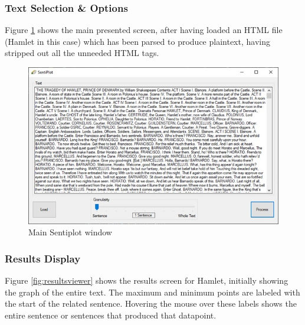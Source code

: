 \documentclass[a4paper]{article}
\begin{document}
    \subsubsection{Text Selection \& Options}
    Figure \ref{fig:sentiplot} shows the main presented screen, after having loaded an HTML file (Hamlet in this case) which has been parsed to produce plaintext, having stripped out all the unneeded HTML tags.
        \begin{figure}[H]
            \includegraphics[width=1\textwidth]{Misc/sentiplot}
            \caption{Main Sentiplot window}
            \label{fig:sentiplot}
        \end{figure}
    \subsubsection{Results Display}
        Figure \ref{fig:resultsviewer} shows the results screen for Hamlet, initially showing the graph of the entire text. The maximum and minimum points are labeled with the start of the related sentence. Hovering the mouse over these labels shows the entire sentence or sentences that produced that datapoint.
\end{document}
